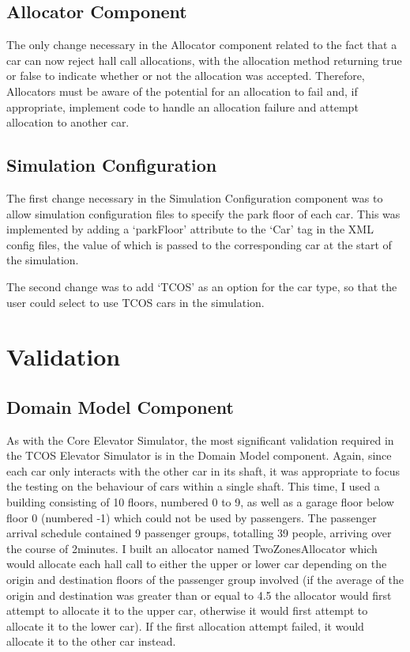\documentclass{UoYCSproject}
\begin{document}
\subsection{Allocator Component}

The only change necessary in the Allocator component related to the fact that a car can now reject hall call allocations, with the allocation method returning true or false to indicate whether or not the allocation was accepted.  Therefore, Allocators must be aware of the potential for an allocation to fail and, if appropriate, implement code to handle an allocation failure and attempt allocation to another car.

\subsection{Simulation Configuration}

The first change necessary in the Simulation Configuration component was to allow simulation configuration files to specify the park floor of each car.  This was implemented by adding a ‘parkFloor’ attribute to the `Car' tag in the XML config files, the value of which is passed to the corresponding car at the start of the simulation.

The second change was to add `TCOS' as an option for the car type, so that the user could select to use TCOS cars in the simulation.

\section{Validation}

\subsection{Domain Model Component}
As with the Core Elevator Simulator, the most significant validation required in the TCOS Elevator Simulator is in the Domain Model component.  Again, since each car only interacts with the other car in its shaft, it was appropriate to focus the testing on the behaviour of cars within a single shaft.  This time, I used a building consisting of 10 floors, numbered 0 to 9, as well as a garage floor below floor 0 (numbered -1) which could not be used by passengers.  The passenger arrival schedule contained 9 passenger groups, totalling 39 people, arriving over the course of 2\textonehalf minutes.  I built an allocator named TwoZonesAllocator which would allocate each hall call to either the upper or lower car depending on the origin and destination floors of the passenger group involved (if the average of the origin and destination was greater than or equal to 4.5 the allocator would first attempt to allocate it to the upper car, otherwise it would first attempt to allocate it to the lower car).  If the first allocation attempt failed, it would allocate it to the other car instead.
\end{document}
